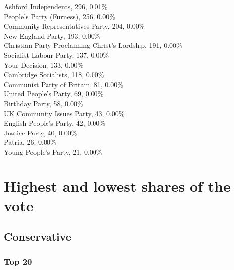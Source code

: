 \documentclass[a4paper,openany,10pt]{book}
\begin{document}
Ashford Independents, 296, 0.01\% \\
People's Party (Furness), 256, 0.00\% \\
Community Representatives Party, 204, 0.00\% \\
New England Party, 193, 0.00\% \\
Christian Party Proclaiming Christ's Lordship, 191, 0.00\% \\
Socialist Labour Party, 137, 0.00\% \\
Your Decision, 133, 0.00\% \\
Cambridge Socialists, 118, 0.00\% \\
Communist Party of Britain, 81, 0.00\% \\
United People's Party, 69, 0.00\% \\
Birthday Party, 58, 0.00\% \\
UK Community Issues Party, 43, 0.00\% \\
English People's Party, 42, 0.00\% \\
Justice Party, 40, 0.00\% \\
Patria, 26, 0.00\% \\
Young People's Party, 21, 0.00\% \\

\section{Highest and lowest shares of the vote}

\subsection*{Conservative}

\subsubsection*{Top 20}
\end{document}
